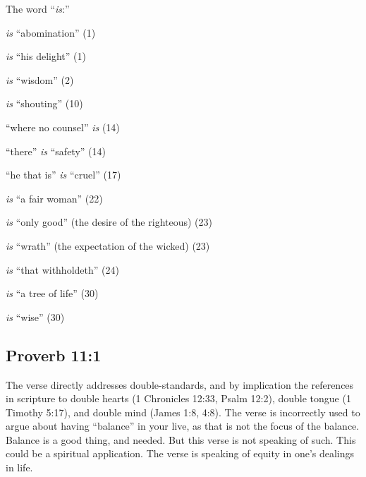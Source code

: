 The word ``\emph{is}:''
\begin{compactenum}
    \item \emph{is} ``abomination'' (1)
     \item \emph{is} ``his delight'' (1)
    \item \emph{is} ``wisdom'' (2)
    \item \emph{is} ``shouting'' (10)
     \item ``where no counsel'' \emph{is}  (14)
     \item ``there'' \emph{is} ``safety'' (14)
    \item ``he that is'' \emph{is} ``cruel'' (17)
   \item \emph{is} ``a fair woman''   (22)
    \item \emph{is} ``only good'' (the desire of the righteous) (23)
    \item \emph{is} ``wrath'' (the expectation of the wicked) (23)
    \item \emph{is} ``that withholdeth'' (24)
    \item \emph{is} ``a tree of life'' (30)
    \item \emph{is} ``wise'' (30)
\end{compactenum}

\subsection{Proverb 11:1}
The verse directly addresses double-standards, and by implication the references in scripture to double hearts (1 Chronicles 12:33, Psalm 12:2),  double tongue (1 Timothy 5:17), and double mind (James 1:8, 4:8).  The verse is incorrectly used to argue about having ``balance'' in your live, as that is not the focus of the balance.  Balance is a good thing, and needed. But this verse is not speaking of such.  This could be a spiritual application.  The verse is speaking of equity in one's dealings in life.

